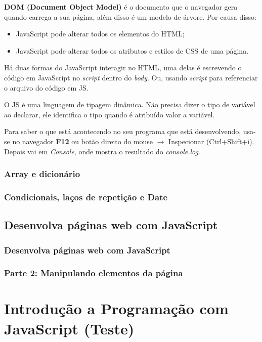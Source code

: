 \documentclass[12pt,a4paper]{article}
\begin{document}
	\textbf{DOM (Document Object Model)} é o documento que o navegador gera quando carrega a sua página, além disso é um modelo de árvore. Por causa disso:
	
	\begin{itemize}
		\item JavaScript pode alterar todos os elementos do HTML;
		\item JavaScript pode alterar todos os atributos e estilos de CSS de uma página.
	\end{itemize}

	Há duas formas do JavaScript interagir no HTML, uma delas é escrevendo o código em JavaScript no \textit{script} dentro do \textit{body}. Ou, usando \textit{script} para referenciar o arquivo do código em JS.
	
	O JS é uma linguagem de tipagem dinâmica. Não precisa dizer o tipo de variável ao declarar, ele identifica o tipo quando é atribuído valor a variável.
	
	Para saber o que está acontecendo no seu programa que está desenvolvendo, usa-se no navegador \textbf{F12} ou botão direito do mouse $\rightarrow$ Inspecionar (Ctrl+Shift+i). Depois vai em \textit{Console}, onde mostra o resultado do \textit{console.log}.
	
	\subsubsection{Array e dicionário}
	
	\subsubsection{Condicionais, laços de repetição e Date}
	
	
	\subsection{Desenvolva páginas web com JavaScript}
	\subsubsection{Desenvolva páginas web com JavaScript}
	
	\subsubsection{Parte 2: Manipulando elementos da página}
	
	
	
	\section{Introdução a Programação com JavaScript (Teste)}
	
\end{document}

